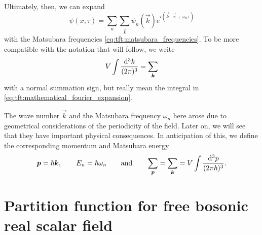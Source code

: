 Ultimately, then, we can expand
\begin{equation}
	\psi(x, \tau) = \sum_n \sum_\vec{k} \psi_n(\vec{k}) e^{i (\vec{k} \cdot \vec{x} + \omega_n \tau)}
\label{eq:tft:fourier_series}
\end{equation}
with the Matsubara frequencies \eqref{eq:tft:matsubara_frequencies}.
To be more compatible with the notation that will follow, we write
\begin{equation}
	V \int \frac{\mathop{}\!\mathrm{d}^3 k}{(2 \pi)^3} = \sum_{\bm{k}}
\label{eq:tft:continuum_limit}
\end{equation}
with a normal summation sign, but really mean the integral in \eqref{eq:tft:mathematical_fourier_expansion}.

The wave number $\vec{k}$ and the Matsubara frequency $\omega_n$ here arose due to geometrical considerations of the periodicity of the field.
Later on, we will see that they have important physical consequences.
In anticipation of this, we define the corresponding momentum and Matsubara energy
\begin{equation}
	{\bm{p}} = \hbar {\bm{k}}, \qquad
	E_n = \hbar \omega_n \qquad \text{and} \qquad
	\sum_{\bm{p}} = \sum_{\bm{k}} = V \int \frac{\mathop{}\!\mathrm{d}^3 p}{(2 \pi \hbar)^3}.
\label{eq:tft:matsubara_energies}
\end{equation}

\section{Partition function for free bosonic real scalar field}


